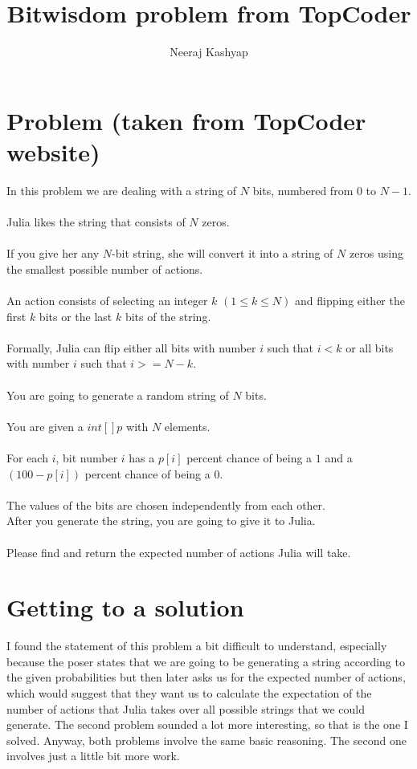 \documentclass{article}
\title{Bitwisdom problem from TopCoder}
\author{Neeraj Kashyap}
\begin{document}
\maketitle

\section{Problem (taken from TopCoder website)}

In this problem we are dealing with a string of $N$ bits, numbered from $0$ to $N-1$.\\
\\
Julia likes the string that consists of $N$ zeros.\\
\\
If you give her any $N$-bit string, she will convert it into a string of $N$ zeros using the smallest possible number of actions.\\
\\
An action consists of selecting an integer $k$ $(1 \leq k \leq N)$ and flipping either the first $k$ bits or the last $k$ bits of the string.\\
\\
Formally, Julia can flip either all bits with number $i$ such that $i < k$ or all bits with number $i$ such that $i >= N - k$.\\
\\
You are going to generate a random string of $N$ bits.\\
\\
You are given a $int[] p$ with $N$ elements.\\
\\
For each $i$, bit number $i$ has a $p[i]$ percent chance of being a $1$ and a $(100 - p[i])$ percent chance of being a $0$.\\
\\
The values of the bits are chosen independently from each other.
\\
After you generate the string, you are going to give it to Julia.\\
\\
Please find and return the expected number of actions Julia will take.


\section{Getting to a solution}

I found the statement of this problem a bit difficult to understand, especially because the poser states that we are going to be generating a string according to the given probabilities but then later asks us for the expected number of actions, which would suggest that they want us to calculate the expectation of the number of actions that Julia takes over all possible strings that we could generate. The second problem sounded a lot more interesting, so that is the one I solved. Anyway, both problems involve the same basic reasoning. The second one involves just a little bit more work.
\end{document}
